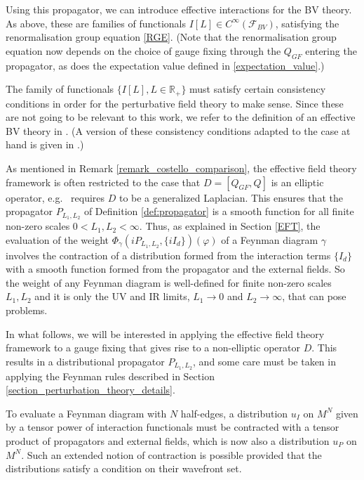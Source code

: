 \documentclass[reqno]{amsart}
\theoremstyle{definition}
\theoremstyle{remark}
\newcommand{\C}{C^\infty}
\newcommand{\F}{\mathcal{F}}
\begin{document}
Using this propagator, we can introduce effective interactions for the BV theory. As above, these are families of functionals $I[L] \in \C(\F_{BV})$, satisfying the renormalisation group equation \eqref{RGE}. (Note that the renormalisation group equation now depends on the choice of gauge fixing through the $Q_{GF}$ entering the propagator, as does the expectation value defined in \eqref{expectation_value}.) 

The family of functionals $\{I[L],L\in\mathbb{R}_+\}$ must satisfy certain consistency conditions in order for the perturbative field theory to make sense. Since these are not going to be relevant to this work, we refer to the definition of an effective BV theory in \cite{costello}. (A version of these consistency conditions adapted to the case at hand is given in \cite{ThomasThesis}.)

As mentioned in Remark \ref{remark_costello_comparison}, the effective field theory framework is often restricted to the case that $D=[Q_{GF},Q]$ is an elliptic operator, e.g.\ \cite{costello} requires $D$ to be a generalized Laplacian. This ensures that the propagator $P_{L_1,L_2}$ of Definition \ref{def:propagator} is a smooth function for all finite non-zero scales $0<L_1,L_2<\infty$. Thus, as explained in Section \ref{EFT}, the evaluation of the weight $\Phi_\gamma(iP_{L_1,L_2},\{iI_d\})(\varphi)$ of a Feynman diagram $\gamma$ involves the contraction of a distribution formed from the interaction terms $\{I_d\}$ with a smooth function formed from the propagator and the external fields. So the weight of any Feynman diagram is well-defined for finite non-zero scales $L_1, L_2$ and it is only the UV and IR limits, $L_1\to 0$ and $L_2\to \infty$, that can pose problems.

In what follows, we will be interested in applying the effective field theory framework to a gauge fixing that gives rise to a non-elliptic operator $D$. This results in a distributional propagator $P_{L_1,L_2}$, and some care must be taken in applying the Feynman rules described in Section \ref{section_perturbation_theory_details}.

To evaluate a Feynman diagram with $N$ half-edges, a distribution $u_I$ on $M^N$ given by a tensor power of interaction functionals must be contracted with a tensor product of propagators and external fields, which is now also a distribution $u_P$ on $M^N$. Such an extended notion of contraction is possible provided that the distributions satisfy a condition on their wavefront set.
\end{document}
